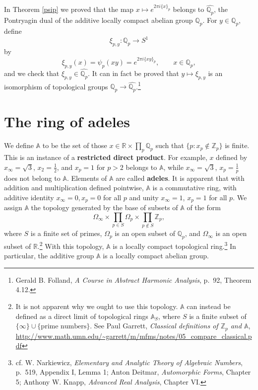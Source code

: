 \documentclass{article}
\theoremstyle{definition}
\theoremstyle{definition}
\begin{document}
In Theorem \ref{psip} we proved that the map $x \mapsto e^{2\pi i\{x\}_p}$ belongs to $\widehat{\mathbb{Q}_p}$, the Pontryagin
dual of the additive locally compact abelian group $\mathbb{Q}_p$.
For $y \in \mathbb{Q}_p$, define
\[
\xi_{p,y}:\mathbb{Q}_p \to S^1
\]
 by
 \[
 \xi_{p,y}(x)=\psi_p(xy) = e^{2\pi i\{xy\}_p}, \qquad x \in \mathbb{Q}_p,
 \]
  and we check that $\xi_{p,y} \in \widehat{\mathbb{Q}_p}$.
It can in fact be proved that  $y \mapsto \xi_{p,y}$ is an isomorphism of topological
groups
$\mathbb{Q}_p \to \widehat{\mathbb{Q}_p}$.\footnote{Gerald B. Folland, {\em A Course in Abstract Harmonic Analysis},
p.~92, Theorem 4.12.}




\section{The ring of adeles}
We define $\mathbb{A}$ to be the set of those
$x \in \mathbb{R} \times \prod_p \mathbb{Q}_p$ such that
$\{p: x_p \not \in \mathbb{Z}_p\}$ is finite. This is an instance of a \textbf{restricted direct product}. For example, 
$x$ defined by $x_\infty=\sqrt{3}$, $x_2=\frac{1}{2}$, and $x_p=1$ for $p>2$ belongs to 
$\mathbb{A}$, while $x_\infty=\sqrt{3}$, $x_p=\frac{1}{p}$ does not belong to $\mathbb{A}$. Elements
of $\mathbb{A}$ are called \textbf{adeles}. It is apparent that with addition and multiplication defined pointwise,
$\mathbb{A}$ is a commutative ring, with additive identity $x_\infty=0, x_p=0$ for all $p$ and unity
$x_\infty=1$, $x_p=1$ for all $p$.
We assign $\mathbb{A}$ the topology generated by the base of subsets of $\mathbb{A}$ of the form
\[
\Omega_\infty \times \prod_{p \in S} \Omega_p \times \prod_{p \not \in S} \mathbb{Z}_p,
\]
where
$S$ is a finite set of primes, $\Omega_p$ is an open subset of $\mathbb{Q}_p$, and $\Omega_\infty$ is an open subset
of $\mathbb{R}$.\footnote{It is not apparent why we ought to use this topology. $\mathbb{A}$ can instead
be defined as a direct limit of topological rings $\mathbb{A}_S$, where $S$ is a finite subset of
$\{\infty\} \cup \{\textrm{prime numbers}\}$. See Paul Garrett,
{\em Classical definitions of $\mathbb{Z}_p$ and $\mathbb{A}$},
\url{http://www.math.umn.edu/~garrett/m/mfms/notes/05_compare_classical.pdf}}
With this topology, $\mathbb{A}$ is a locally compact topological ring.\footnote{cf. W.
 Narkiewicz, {\em Elementary and Analytic Theory of Algebraic Numbers}, p.~519, Appendix  I, Lemma 1; Anton Deitmar, {\em Automorphic Forms}, Chapter 5;
 Anthony W. Knapp, {\em Advanced Real Analysis}, Chapter VI.}
 In particular, the additive group $\mathbb{A}$ is a locally compact abelian group. 
\end{document}
